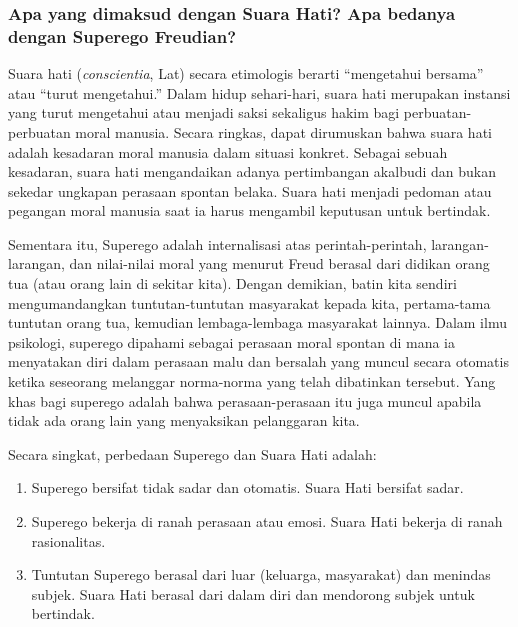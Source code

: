 \documentclass[11pt,twoside,a5paper,openany]{memoir}
\def\tightlist{}
\begin{document}
\hypertarget{apa-yang-dimaksud-dengan-suara-hati-apa-bedanya-dengan-superego-freudian}{%
\subsubsection{Apa yang dimaksud dengan Suara Hati? Apa bedanya dengan
Superego
Freudian?}\label{apa-yang-dimaksud-dengan-suara-hati-apa-bedanya-dengan-superego-freudian}}

Suara hati (\emph{conscientia}, Lat) secara etimologis berarti
``mengetahui bersama'' atau ``turut mengetahui.'' Dalam hidup
sehari-hari, suara hati merupakan instansi yang turut mengetahui atau
menjadi saksi sekaligus hakim bagi perbuatan-perbuatan moral manusia.
Secara ringkas, dapat dirumuskan bahwa suara hati adalah kesadaran moral
manusia dalam situasi konkret. Sebagai sebuah kesadaran, suara hati
mengandaikan adanya pertimbangan akalbudi dan bukan sekedar ungkapan
perasaan spontan belaka. Suara hati menjadi pedoman atau pegangan moral
manusia saat ia harus mengambil keputusan untuk bertindak.

Sementara itu, Superego adalah internalisasi atas perintah-perintah,
larangan-larangan, dan nilai-nilai moral yang menurut Freud berasal dari
didikan orang tua (atau orang lain di sekitar kita). Dengan demikian,
batin kita sendiri mengumandangkan tuntutan-tuntutan masyarakat kepada
kita, pertama-tama tuntutan orang tua, kemudian lembaga-lembaga
masyarakat lainnya. Dalam ilmu psikologi, superego dipahami sebagai
perasaan moral spontan di mana ia menyatakan diri dalam perasaan malu
dan bersalah yang muncul secara otomatis ketika seseorang melanggar
norma-norma yang telah dibatinkan tersebut. Yang khas bagi superego
adalah bahwa perasaan-perasaan itu juga muncul apabila tidak ada orang
lain yang menyaksikan pelanggaran kita.

Secara singkat, perbedaan Superego dan Suara Hati adalah:

\begin{enumerate}
\def\labelenumi{\alph{enumi}.}
\tightlist
\item
  Superego bersifat tidak sadar dan otomatis. Suara Hati bersifat sadar.
\item
  Superego bekerja di ranah perasaan atau emosi. Suara Hati bekerja di
  ranah rasionalitas.
\item
  Tuntutan Superego berasal dari luar (keluarga, masyarakat) dan
  menindas subjek. Suara Hati berasal dari dalam diri dan mendorong
  subjek untuk bertindak.
\end{enumerate}
\end{document}
